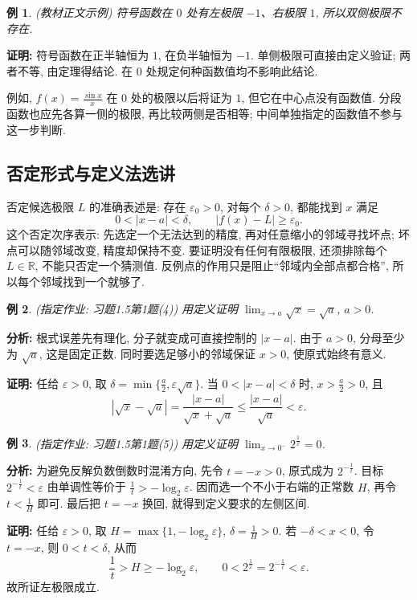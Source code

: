 \documentclass[UTF8,openany]{ctexbook}
\theoremstyle{chinesetextbook}
\newtheorem{example}{例}[section]
\newenvironment{cnproof}{\par\indent\textbf{证明:} \ignorespaces}{\par}
\begin{document}
\begin{example}
(教材正文示例) 符号函数在 $0$ 处有左极限 $-1$、右极限 $1$, 所以双侧极限不存在.
\end{example}
\begin{cnproof}
符号函数在正半轴恒为 $1$, 在负半轴恒为 $-1$. 单侧极限可直接由定义验证; 两者不等, 由定理得结论. 在 $0$ 处规定何种函数值均不影响此结论.
\end{cnproof}
例如, $\displaystyle f(x)=\frac{\sin x}x$ 在 $0$ 处的极限以后将证为 $1$, 但它在中心点没有函数值. 分段函数也应先各算一侧的极限, 再比较两侧是否相等; 中间单独指定的函数值不参与这一步判断.
\subsection{否定形式与定义法选讲}
否定候选极限 $L$ 的准确表述是: 存在 $\varepsilon_0>0$, 对每个 $\delta>0$, 都能找到 $x$ 满足
\[
0<|x-a|<\delta,\qquad |f(x)-L|\ge\varepsilon_0.
\]
这个否定次序表示: 先选定一个无法达到的精度, 再对任意缩小的邻域寻找坏点; 坏点可以随邻域改变, 精度却保持不变. 要证明没有任何有限极限, 还须排除每个 $L\in\mathbb R$, 不能只否定一个猜测值. 反例点的作用只是阻止“邻域内全部点都合格”, 所以每个邻域找到一个就够了.
\begin{example}
(指定作业: 习题1.5第1题(4)) 用定义证明 $\displaystyle \lim_{x\to a}\sqrt x=\sqrt a$, $a>0$.
\end{example}
\par\indent\textbf{分析:} 根式误差先有理化, 分子就变成可直接控制的 $|x-a|$. 由于 $a>0$, 分母至少为 $\sqrt a$, 这是固定正数. 同时要选足够小的邻域保证 $x>0$, 使原式始终有意义.
\begin{cnproof}
任给 $\varepsilon>0$, 取 $\displaystyle \delta=\min\{\frac a2,\varepsilon\sqrt a\}$. 当 $0<|x-a|<\delta$ 时, $\displaystyle x>\frac a2>0$, 且
\[
|\sqrt x-\sqrt a|=\frac{|x-a|}{\sqrt x+\sqrt a}
\le\frac{|x-a|}{\sqrt a}<\varepsilon.
\]
\end{cnproof}
\begin{example}
(指定作业: 习题1.5第1题(5)) 用定义证明 $\displaystyle \lim_{x\to0^-}2^{\frac1x}=0$.
\end{example}
\par\indent\textbf{分析:} 为避免反解负数倒数时混淆方向, 先令 $t=-x>0$, 原式成为 $2^{-\frac1t}$. 目标 $2^{-\frac1t}<\varepsilon$ 由单调性等价于 $\displaystyle\frac1t>-\log_2\varepsilon$. 因而选一个不小于右端的正常数 $H$, 再令 $\displaystyle t<\frac1H$ 即可. 最后把 $t=-x$ 换回, 就得到定义要求的左侧区间.
\begin{cnproof}
任给 $\varepsilon>0$, 取 $H=\max\{1,-\log_2\varepsilon\}$, $\displaystyle\delta=\frac1H>0$. 若 $-\delta<x<0$, 令 $t=-x$, 则 $0<t<\delta$, 从而
\[
\frac1t>H\ge-\log_2\varepsilon,\qquad
0<2^{\frac1x}=2^{-\frac1t}<\varepsilon.
\]
故所证左极限成立.
\end{cnproof}
\end{document}
